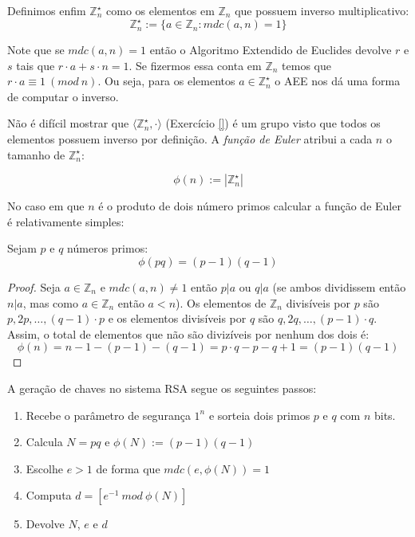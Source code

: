 Definimos enfim $\mathbb{Z}_n^\star$ como os elementos em $\mathbb{Z}_n$ que possuem inverso multiplicativo:
\begin{displaymath}
  \mathbb{Z}_n^\star := \{a \in \mathbb{Z}_n : mdc(a,n) = 1\}
\end{displaymath}

Note que se $mdc(a,n) = 1$ então o Algoritmo Extendido de Euclides devolve $r$ e $s$ tais que $r \cdot a + s \cdot n = 1$.
Se fizermos essa conta em $\mathbb{Z}_n$ temos que $r \cdot a \equiv 1\ (mod\ n)$.
Ou seja, para os elementos $a \in \mathbb{Z}_n^\star$ o AEE nos dá uma forma de computar o inverso.
 
Não é difícil mostrar que $\langle \mathbb{Z}_n^\star, \cdot \rangle$ (Exercício \ref{}) é um grupo visto que todos os elementos possuem inverso por definição.
A {\em função de Euler} atribui a cada $n$ o tamanho de $\mathbb{Z}_n^\star$:

\begin{displaymath}
  \phi(n) := |\mathbb{Z}_n^\star|
\end{displaymath}

No caso em que $n$ é o produto de dois número primos calcular a função de Euler é relativamente simples:

\begin{proposition}
Sejam $p$ e $q$ números primos:  
\begin{displaymath}
  \phi(pq) = (p - 1)(q - 1)
\end{displaymath}
\end{proposition}
\begin{proof}
Seja $a \in \mathbb{Z}_n$ e $mdc(a, n) \neq 1$ então $p|a$ ou $q|a$ (se ambos dividissem então $n|a$, mas como $a \in \mathbb{Z}_n$ então $a < n$).
Os elementos de $\mathbb{Z}_n$ divisíveis por $p$ são $p, 2p, \dots , (q - 1) \cdot p$ e os elementos divisíveis por $q$ são $q, 2q, \dots , (p - 1) \cdot q$. 
Assim, o total de elementos que não são divizíveis por nenhum dos dois é:
\begin{displaymath}
  \phi(n) = n - 1 - (p - 1) - (q - 1) = p \cdot q - p - q + 1 = (p - 1)(q - 1)
\end{displaymath}


\end{proof}

A geração de chaves no sistema RSA segue os seguintes passos:
\begin{enumerate}
\item Recebe o parâmetro de segurança $1^n$ e sorteia dois primos $p$ e $q$ com $n$ bits.
\item Calcula $N = pq$ e $\phi(N) := (p - 1)(q - 1)$
\item Escolhe $e > 1$ de forma que $mdc(e, \phi(N)) = 1$
\item Computa $d = [e^{-1}\ mod\ \phi(N)]$
\item Devolve $N$, $e$ e $d$ 
\end{enumerate}

